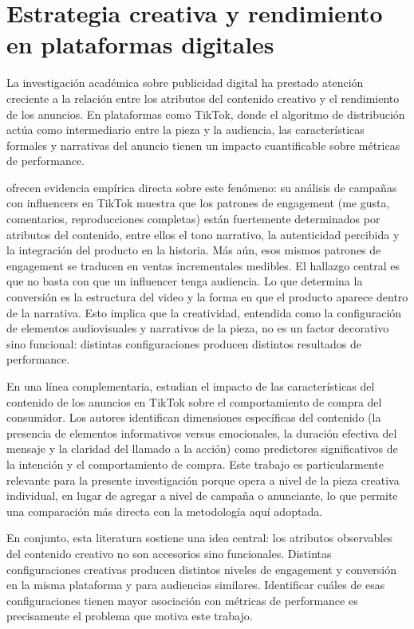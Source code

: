 \documentclass[12pt, a4paper]{report}
\begin{document}
\section{Estrategia creativa y rendimiento en plataformas digitales}

La investigación académica sobre publicidad digital ha prestado atención creciente a la relación entre
los atributos del contenido creativo y el rendimiento de los anuncios. En plataformas 
como TikTok, donde el algoritmo de distribución actúa como intermediario entre la pieza
y la audiencia, las características formales y narrativas del anuncio tienen un impacto cuantificable sobre
métricas de performance.

\citet{yang2025} ofrecen evidencia empírica directa sobre este fenómeno: su análisis de campañas con
influencers en TikTok muestra que los patrones de engagement (me gusta, comentarios, reproducciones
completas) están fuertemente determinados por atributos del contenido, entre ellos el tono narrativo,
la autenticidad percibida y la integración del producto en la historia. Más aún, esos mismos patrones
de engagement se traducen en ventas incrementales medibles. El hallazgo central es que no basta con
que un influencer tenga audiencia. Lo que determina la conversión es la estructura del video y la forma
en que el producto aparece dentro de la narrativa. Esto implica que la creatividad, entendida como la
configuración de elementos audiovisuales y narrativos de la pieza, no es un factor decorativo sino
funcional: distintas configuraciones producen distintos resultados de performance.

En una línea complementaria, \citet{meng2024} estudian el impacto de las características del contenido
de los anuncios en TikTok sobre el comportamiento de compra del consumidor. Los autores
identifican dimensiones específicas del contenido (la presencia de elementos informativos versus
emocionales, la duración efectiva del mensaje y la claridad del llamado a la acción) como predictores
significativos de la intención y el comportamiento de compra. Este trabajo es particularmente relevante
para la presente investigación porque opera a nivel de la pieza creativa individual, en lugar de
agregar a nivel de campaña o anunciante, lo que permite una comparación más directa con la metodología
aquí adoptada.

En conjunto, esta literatura sostiene una idea central: los atributos observables del contenido
creativo no son accesorios sino funcionales. Distintas configuraciones creativas producen distintos
niveles de engagement y conversión en la misma plataforma y para audiencias similares. Identificar
cuáles de esas configuraciones tienen mayor asociación con métricas de performance es precisamente
el problema que motiva este trabajo.
\end{document}
